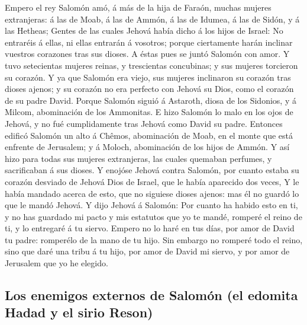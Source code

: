  Empero el rey Salomón amó, á más de la hija de Faraón,
muchas mujeres extranjeras: á las de Moab, á las de Ammón, á las de
Idumea, á las de Sidón, y á las Hetheas;  Gentes de las
cuales Jehová había dicho á los hijos de Israel: No entraréis á ellas,
ni ellas entrarán á vosotros; porque ciertamente harán inclinar vuestros
corazones tras sus dioses. A éstas pues se juntó Salomón con amor.
 Y tuvo setecientas mujeres reinas, y trescientas
concubinas; y sus mujeres torcieron su corazón.  Y ya que
Salomón era viejo, sus mujeres inclinaron su corazón tras dioses ajenos;
y su corazón no era perfecto con Jehová su Dios, como el corazón de su
padre David.  Porque Salomón siguió á Astaroth, diosa de los
Sidonios, y á Milcom, abominación de los Ammonitas.  E hizo
Salomón lo malo en los ojos de Jehová, y no fué cumplidamente tras
Jehová como David su padre.  Entonces edificó Salomón un
alto á Chêmos, abominación de Moab, en el monte que está enfrente de
Jerusalem; y á Moloch, abominación de los hijos de Ammón.  Y
así hizo para todas sus mujeres extranjeras, las cuales quemaban
perfumes, y sacrificaban á sus dioses.  Y enojóse Jehová
contra Salomón, por cuanto estaba su corazón desviado de Jehová Dios de
Israel, que le había aparecido dos veces,  Y le había
mandado acerca de esto, que no siguiese dioses ajenos: mas él no guardó
lo que le mandó Jehová.  Y dijo Jehová á Salomón: Por
cuanto ha habido esto en ti, y no has guardado mi pacto y mis estatutos
que yo te mandé, romperé el reino de ti, y lo entregaré á tu siervo.
 Empero no lo haré en tus días, por amor de David tu padre:
romperélo de la mano de tu hijo.  Sin embargo no romperé
todo el reino, sino que daré una tribu á tu hijo, por amor de David mi
siervo, y por amor de Jerusalem que yo he elegido.

\hypertarget{los-enemigos-externos-de-salomuxf3n-el-edomita-hadad-y-el-sirio-reson}{%
\subsection{Los enemigos externos de Salomón (el edomita Hadad y el
sirio
Reson)}\label{los-enemigos-externos-de-salomuxf3n-el-edomita-hadad-y-el-sirio-reson}}

